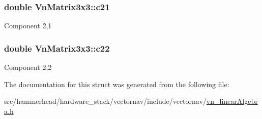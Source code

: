 \subsubsection[{\texorpdfstring{c21}{c21}}]{\setlength{\rightskip}{0pt plus 5cm}double Vn\+Matrix3x3\+::c21}\hypertarget{structVnMatrix3x3_aaa5cd2e083d4d74a9daa952e9529d792}{}\label{structVnMatrix3x3_aaa5cd2e083d4d74a9daa952e9529d792}
Component 2,1 
\subsubsection[{\texorpdfstring{c22}{c22}}]{\setlength{\rightskip}{0pt plus 5cm}double Vn\+Matrix3x3\+::c22}\hypertarget{structVnMatrix3x3_a834555c80c271a105fbe9667b5b600d2}{}\label{structVnMatrix3x3_a834555c80c271a105fbe9667b5b600d2}
Component 2,2 

The documentation for this struct was generated from the following file\+:\begin{DoxyCompactItemize}
\item 
src/hammerhead/hardware\+\_\+stack/vectornav/include/vectornav/\hyperlink{vn__linearAlgebra_8h}{vn\+\_\+linear\+Algebra.\+h}\end{DoxyCompactItemize}
